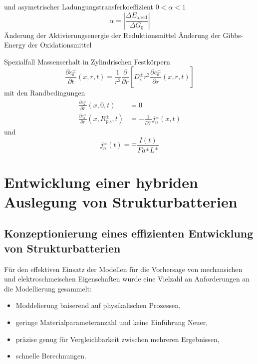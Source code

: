 und asymetrischer Ladungungstransferkoeffizient $0<\alpha<1$
\begin{equation}
        \alpha = \left|\frac{\Delta E_{\text{a,red}}}{\Delta G_0}\right|
\end{equation}
Änderung der Aktivierungsenergie der Reduktionsmittel
Änderung der Gibbs-Energy der Oxidationsmittel




Spezialfall Massenserhalt in Zylindrischen Festkörpern
\begin{equation}
    \frac{\partial c_{\text{s}}^{\pm}}{\partial t}(x,r,t) = \frac{1}{r^2} \frac{\partial}{ \partial r} \left[ D_{\text{s}}^\pm r^2 \frac{\partial c_{\text{s}}^\pm}{\partial r}(x,r,t)\right]
\end{equation}
mit den Randbedingungen
\begin{align}
    \frac{\partial c_{\text{s}}^{\pm}}{\partial r}(x,0,t) &= 0 \\
    \frac{\partial c_{\text{s}}^{\pm}}{\partial r}(x,R_{\text{p,s}}^{\pm},t) &= -\frac{1}{ D_{\text{s}}^\pm} j_{n}^{\pm}(x,t)
\end{align}
und
\begin{equation}
j_{n}^{\pm}(t) = \mp \frac{I(t)}{F a^{\pm} L^{\pm}}
\end{equation}

\chapter{Entwicklung einer hybriden Auslegung von Strukturbatterien}

\section{Konzeptionierung eines effizienten Entwicklung von Strukturbatterien}
Für den effektiven Einsatz der Modellen für die Vorhersage von mechansichen und elektroschmeischen Eigenschaften wurde eine Vielzahl an Anforderungen an die Modellierung gesammelt:
\begin{itemize}
    \item Moddelierung baiserend auf physikalischen Prozessen, %
    \item geringe Materialparameteranzahl und keine Einführung Neuer, %
    \item präzise genug für Vergleichbarkeit zwischen mehreren Ergebnissen, %
    \item schnelle Berechnungen. %
\end{itemize} 

